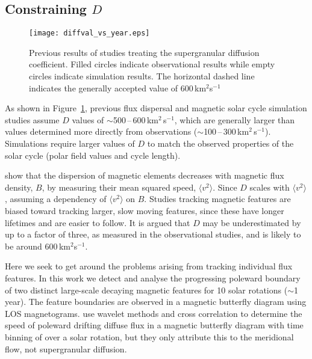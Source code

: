 \subsection{Constraining $D$}\label{sect:constraind}

 \begin{figure}[!t]    %
   \centerline{\texttt{[image: diffval\_vs\_year.eps]}
              }
              \caption[Previous supergranular diffusion study results.]{Previous results of studies treating the supergranular diffusion coefficient. Filled circles indicate observational results while empty circles indicate simulation results. The horizontal dashed line indicates the generally accepted value of 600\,km$^2$s$^{-1}$}
   \label{fig:prevdiffcoeff}
   \end{figure}

As shown in Figure~\ref{fig:prevdiffcoeff}, previous flux dispersal and magnetic solar cycle simulation studies assume $D$ values of $\sim$500\,--\,600\,km$^2$\,s$^{-1}$, which are generally larger than  values determined more directly from observations ($\sim$100\,--\,300\,km$^2$\,s$^{-1}$). Simulations require larger values of $D$ to match the observed properties of the solar cycle (polar field values and cycle length). 

\cite{Schrijver:1996} show that the dispersion of magnetic elements decreases with magnetic flux density, $B$, by measuring their mean squared speed, $\langle v^2 \rangle$. Since $D$ scales with $\langle v^2 \rangle$, assuming a dependency of $\langle v^2 \rangle$ on $B$. Studies tracking magnetic features are biased toward tracking larger, slow moving features, since these have longer lifetimes and are easier to follow. It is argued that $D$ may be underestimated by up to a factor of three, as measured in the observational studies, and is likely to be around 600\,km$^2$s$^{-1}$. 

Here we seek to get around the problems arising from tracking individual flux features. In this work we detect and analyse the progressing poleward boundary of two distinct large-scale decaying magnetic features for 10 solar rotations ($\sim$1\,year). The feature boundaries are observed in a magnetic butterfly diagram \citep{Harvey:1992} using LOS magnetograms.  \cite{Svanda:2007} use wavelet methods and cross correlation to determine the speed of poleward drifting diffuse flux in a  magnetic butterfly diagram with time binning of over a solar rotation, but they only attribute this to the meridional flow, not supergranular diffusion. %

